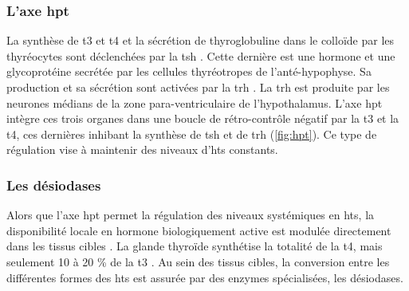 \documentclass[../main.tex]{subfiles}
\begin{document}
\subsubsection{L'axe \gls{hpt}}\label{subsubsec:hpt}
La synthèse de \gls{t3} et \gls{t4} et la sécrétion de thyroglobuline dans le colloïde par les thyréocytes sont déclenchées par la \gls{tsh} \citep{Vagenakis1973}.
Cette dernière est une hormone et une glycoprotéine secrétée par les cellules thyréotropes de l'anté-hypophyse.
Sa production et sa sécrétion sont activées par la \gls{trh} \citep{Halasz1965}.
La \gls{trh} est produite par les neurones médians de la zone para-ventriculaire de l'hypothalamus.
L'axe  \gls{hpt} intègre ces trois organes dans une boucle de rétro-contrôle négatif par la \gls{t3} et la \gls{t4}, ces dernières inhibant la synthèse de \gls{tsh} \citep{Larsen1982} et de \gls{trh} \citep{Koller1987} (\autoref{fig:hpt}).
Ce type de régulation vise à maintenir des niveaux d'\glspl{ht} constants.



\subsubsection{Les désiodases}
Alors que l'axe \gls{hpt} permet la régulation des niveaux systémiques en \glspl{ht}, la disponibilité locale en hormone biologiquement active est modulée directement dans les tissus cibles \citep{Bianco2006}.
La glande thyroïde synthétise la totalité de la \gls{t4}, mais seulement 10 à 20 \% de la \gls{t3} \citep{Laurberg1984}.
Au sein des tissus cibles, la conversion entre les différentes formes des \glspl{ht} est assurée par des enzymes spécialisées, les désiodases.


\end{document}
